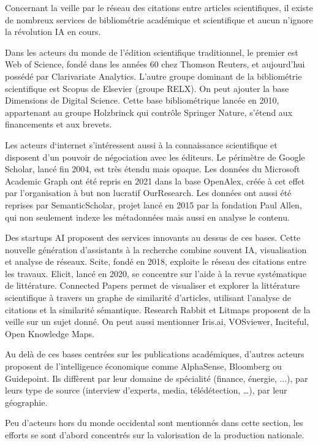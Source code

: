 \documentclass[a4paper,11pt]{report}
\begin{document}
Concernant la veille par le réseau des citations entre articles scientifiques, il existe de nombreux services de bibliométrie académique et scientifique \citep{5WPNTHNM} et aucun n'ignore la révolution IA en cours.

Dans les acteurs du monde de l'édition scientifique traditionnel, le premier est Web of Science, fondé dans les années 60 chez Thomson Reuters, et aujourd'hui possédé par Clarivariate Analytics. L'autre groupe dominant de la bibliométrie scientifique est Scopus de Elsevier (groupe RELX). On peut ajouter la base Dimensions de Digital Science. Cette base bibliométrique lancée en 2010, appartenant au groupe Holzbrinck qui contrôle Springer Nature, s'étend aux financements et aux brevets.

Les acteurs d`internet s'intéressent aussi à la connaissance scientifique et disposent d'un pouvoir de négociation avec les éditeurs. Le périmètre de Google Scholar, lancé fin 2004, est très étendu mais opaque. Les données du Microsoft Academic Graph ont été repris en 2021 dans la base OpenAlex, créée à cet effet par l'organisation à but non lucratif OurResearch. Les données ont aussi été reprises par SemanticScholar, projet lancé en 2015 par la fondation Paul Allen, qui non seulement indexe les métadonnées mais aussi en analyse le contenu.

Des startups AI proposent des services innovants au dessus de ces bases. Cette nouvelle génération d'assistants à la recherche combine souvent IA, visualisation et analyse de réseaux. Scite, fondé en 2018, exploite le réseau des citations entre les travaux. Elicit, lancé en 2020, se concentre sur l'aide à la revue systématique de littérature. Connected Papers permet de visualiser et explorer la littérature scientifique à travers un graphe de similarité d'articles, utilisant l'analyse de citations et la similarité sémantique. Research Rabbit et Litmaps proposent de la veille sur un sujet donné. On peut aussi mentionner Iris.ai, VOSviewer, Inciteful, Open Knowledge Maps.

Au delà de ces bases centrées sur les publications académiques, d'autres acteurs proposent de l'intelligence économique comme AlphaSense, Bloomberg ou Guidepoint. Ils diffèrent par leur domaine de spécialité (finance, énergie, ...), par leurs type de source (interview d'experts, media, télédétection, \ldots), par leur géographie.

Peu d'acteurs hors du monde occidental sont mentionnés dans cette section, les efforts se sont d'abord concentrés sur la valorisation de la production nationale.
\end{document}
